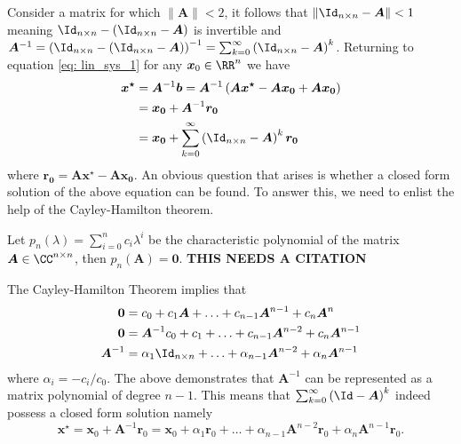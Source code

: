 Consider a matrix for which $\| \bm{A} \| < 2$, it follows that $\| \Id_{n \times n} - \bm{A} \| < 1$ meaning $\Id_{n \times n} - \left( \Id_{n \times n} - \bm{A} \right)$ is invertible and $\bm{A}^{-1} = \left( \Id_{n \times n} - \left( \Id_{n \times n} - \bm{A} \right) \right)^{-1} = \sum_{k=0}^{\infty} \left( \Id_{n \times n} - \bm{A} \right)^{k}$. Returning to equation \ref{eq: lin_sys_1} for any $\bm{x}_0 \in \RR^{n}$ we have
\begin{align*}
    \bm{x^{\star}} & = \bm{A}^{-1} \bm{b} = \bm{A}^{-1} \left( \bm{A} \bm{x^{\star}} - \bm{A} \bm{x_0} + \bm{A} \bm{x_0} \right) \\
                   & = \bm{x_0} + \bm{A}^{-1} \bm{r_0}                                                                           \\
                   & = \bm{x_0} + \sum_{k=0}^{\infty} \left( \Id_{n \times n} - \bm{A} \right)^k \bm{r_0}
\end{align*}
where $\bm{r_0} = \bm{A} \bm{x^{\star}} - \bm{A} \bm{x_0}$. An obvious question that arises is whether a closed form solution of the above equation can be found. To answer this, we need to enlist the help of the Cayley-Hamilton theorem.
\begin{thm} \label{theorem: cayley_amilton}
    Let $p_n \left( \lambda \right) = \sum_{i=0}^{n} c_i \lambda^{i}$ be the characteristic polynomial of the matrix $\bm{A} \in \CC^{n \times n}$, then $p_n \left( \bm{A} \right) = \bm{0}$. {\color{red} \textbf{THIS NEEDS A CITATION}}
\end{thm}
The Cayley-Hamilton Theorem implies that
\begin{align*}
    \bm{0}      & = c_0 + c_1 \bm{A} + \ldots + c_{n-1} \bm{A}^{n-1} + c_{n} \bm{A}^{n}                      \\
    \bm{0}      & = \bm{A}^{-1} c_0 + c_1 + \ldots + c_{n-1} \bm{A}^{n-2} + c_{n} \bm{A}^{n-1}               \\
    \bm{A}^{-1} & = \alpha_1 \Id_{n \times n} + \ldots + \alpha_{n-1} \bm{A}^{n-2} + \alpha_{n} \bm{A}^{n-1}
\end{align*}
where $\alpha_i = -c_i / c_0$. The above demonstrates that $\bm{A}^{-1}$ can be represented as a matrix polynomial of degree $n-1$. This means that $\sum_{k=0}^{\infty} \left( \Id - \bm{A} \right)^k$ indeed possess a closed form solution namely
\begin{equation} \label{eq: x_ast_via_cayley}
    \bm{x^{\star}} = \bm{x}_0 + \bm{A}^{-1} \bm{r}_0 = \bm{x}_0 + \alpha_1 \bm{r}_0 + \ldots + \alpha_{n-1} \bm{A}^{n-2} \bm{r}_0 + \alpha_{n} \bm{A}^{n-1} \bm{r}_0.
\end{equation}
